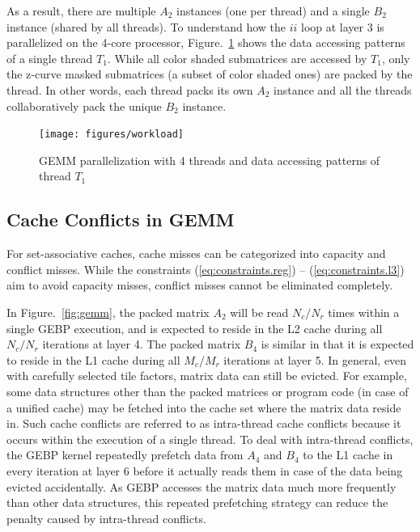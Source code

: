 As a result, there are multiple $A_2$ instances (one per thread)
and a single $B_2$ instance (shared by all threads).
To understand how the $ii$ loop at layer 3 is parallelized on the 4-core processor, 
Figure.~\ref{fig:workload} shows the data accessing patterns
of a single thread $T_1$.
While all color shaded submatrices are accessed by $T_1$,
only the z-curve masked submatrices (a subset of color shaded ones)
are packed by the thread.
In other words, each thread packs its own $A_2$ instance and  all the threads collaboratively pack the unique $B_2$ instance.

\begin{figure}[t]
  \centering
  \texttt{[image: figures/workload]}
  \caption{GEMM parallelization with 4 threads and data accessing patterns of thread $T_1$}
  \label{fig:workload}
\end{figure}

\subsection{Cache Conflicts in GEMM}\label{subsec:cache-conflicts}

For set-associative caches, cache misses can be categorized
into capacity and conflict misses.
While the constraints (\ref{eq:constraints.reg}) -- (\ref{eq:constraints.l3})
aim to avoid capacity misses,
conflict misses cannot be eliminated completely.

In Figure.~\ref{fig:gemm}, the packed matrix $A_2$
will be read $N_c/N_r$ times within a single GEBP execution,
and is expected to reside in the 
L2 cache during all $N_c/N_r$ iterations at layer 4.
The packed matrix $B_4$ is similar in that it is expected to
reside in the L1 cache during all $M_c/M_r$ iterations at layer 5.
In general, even with carefully selected tile factors,
matrix data can still be evicted.
For example, some data structures other than the packed matrices
or program code (in case of a unified cache) may be fetched into the
cache set where the matrix data reside in.
Such cache conflicts are referred to as
intra-thread cache conflicts
because it occurs within the execution of a single thread.
To deal with intra-thread conflicts,
the GEBP kernel repeatedly prefetch data from $A_4$ and $B_4$ to the L1 cache
in every iteration at layer 6 before it actually reads them in case of
the data being evicted accidentally.
As GEBP accesses the matrix data much more frequently than other
data structures, this repeated prefetching strategy
can reduce the penalty caused by intra-thread conflicts.


